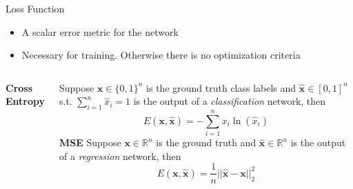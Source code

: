 \documentclass{beamer}
\begin{document}
\begin{frame}{Loss Function}
    \begin{itemize}
        \item A scalar error metric for the network
        \item Necessary for training. Otherwise there is no optimization criteria
    \end{itemize}
    \hspace{-10pt}{\bf Popular examples:}

    \vspace{20pt}
    \begin{columns}
            {\bf Cross Entropy}

            Suppose $\mathbf{x} \in \{0,1\}^n$ is the ground truth class labels
            and $\hat{\mathbf{x}} \in [0,1]^n$ s.t. $\sum_{i=1}^n\hat{x}_i = 1$
            is the output of a \textit{classification} network, then
            \[
                E(\mathbf{x}, \hat{\mathbf{x}}) = -\sum_{i=1}^n x_i \ln(\hat{x}_i)
            \]
            {\bf MSE}
            Suppose $\mathbf{x} \in \mathbb{R}^n$ is the ground truth  
            and $\hat{\mathbf{x}} \in \mathbb{R}^n$ is the output of a \textit{regression} network, then
            \[
                E(\mathbf{x}, \hat{\mathbf{x}}) = \frac{1}{n} ||\hat{\mathbf{x}} - \mathbf{x}||_2^2
            \]
            \vspace{10pt}

    \end{columns}    

\end{frame}
\end{document}
